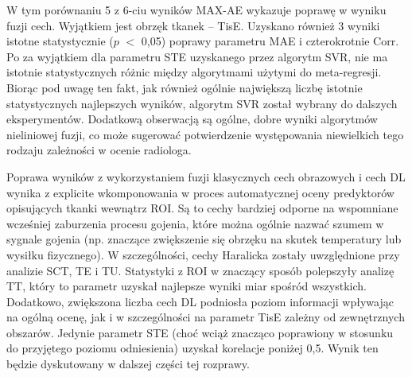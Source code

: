 W tym porównaniu 5 z 6-ciu wyników MAX-AE wykazuje poprawę w wyniku fuzji cech. Wyjątkiem jest obrzęk tkanek -- TisE. Uzyskano również 3 wyniki istotne statystycznie ($p$ $<$ 0,05) poprawy parametru MAE i czterokrotnie Corr. Po za wyjątkiem dla parametru STE uzyskanego przez algorytm SVR, nie ma istotnie statystycznych różnic między algorytmami użytymi do meta-regresji. Biorąc pod uwagę ten fakt, jak również ogólnie największą liczbę istotnie statystycznych najlepszych wyników, algorytm SVR został wybrany do dalszych eksperymentów. Dodatkową obserwacją są ogólne, dobre wyniki algorytmów nieliniowej fuzji, co może sugerować potwierdzenie występowania niewielkich tego rodzaju zależności w ocenie radiologa. 

Poprawa wyników z wykorzystaniem fuzji klasycznych cech obrazowych \linebreak i cech DL wynika z explicite wkomponowania w proces automatycznej oceny predyktorów opisujących tkanki wewnątrz ROI. Są to cechy bardziej odporne na wspomniane wcześniej zaburzenia procesu gojenia, które można ogólnie nazwać szumem w sygnale gojenia (np. znaczące zwiększenie się obrzęku na skutek temperatury lub wysiłku fizycznego). W szczególności, cechy Haralicka zostały uwzględnione przy analizie SCT, TE i TU. Statystyki z ROI w znaczący sposób polepszyły analizę TT, który to parametr uzyskał najlepsze wyniki miar spośród wszystkich. Dodatkowo, zwiększona liczba cech DL podniosła poziom informacji wpływając na ogólną ocenę, jak i w szczególności na parametr TisE zależny od zewnętrznych obszarów. Jedynie parametr STE (choć wciąż znacząco poprawiony w stosunku do przyjętego poziomu odniesienia) uzyskał korelacje poniżej 0,5. Wynik ten będzie dyskutowany w dalszej części tej rozprawy.

